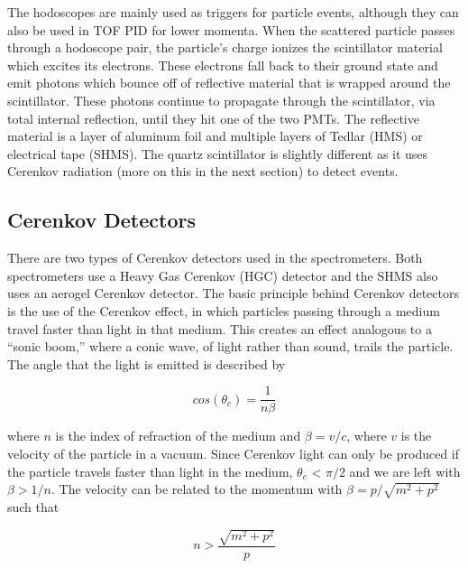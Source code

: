 \documentclass[
]{report}
\begin{document}


The hodoscopes are mainly used as triggers for particle events, although
they can also be used in TOF PID for lower momenta. When the scattered
particle passes through a hodoscope pair, the particle's charge ionizes
the scintillator material which excites its electrons. These electrons
fall back to their ground state and emit photons which bounce off of
reflective material that is wrapped around the scintillator. These
photons continue to propagate through the scintillator, via total
internal reflection, until they hit one of the two PMTs. The reflective
material is a layer of aluminum foil and multiple layers of Tedlar (HMS)
or electrical tape (SHMS). The quartz scintillator is slightly different
as it uses Cerenkov radiation (more on this in the next section) to
detect events.

\hypertarget{cerenkov-detectors}{%
\subsection{Cerenkov Detectors}\label{cerenkov-detectors}}

There are two types of Cerenkov detectors used in the spectrometers.
Both spectrometers use a Heavy Gas Cerenkov (HGC) detector and the SHMS
also uses an aerogel Cerenkov detector. The basic principle behind
Cerenkov detectors is the use of the Cerenkov effect, in which particles
passing through a medium travel faster than light in that medium. This
creates an effect analogous to a ``sonic boom,'' where a conic wave, of
light rather than sound, trails the particle. The angle that the light
is emitted is described by

\begin{equation} 
  cos(\theta_c) = \frac{1}{n\beta}
  \label{eq:theta_cer} 
\end{equation}

where \(n\) is the index of refraction of the medium and \(\beta=v/c\),
where \(v\) is the velocity of the particle in a vacuum. Since Cerenkov
light can only be produced if the particle travels faster than light in
the medium, \(\theta_c\) \textless{} \(\pi/2\) and we are left with
\(\beta > 1/n\). The velocity can be related to the momentum with
\(\beta=p/\sqrt{m^2+p^2}\) such that

\begin{equation} 
  n >\frac{\sqrt{m^2+p^2}}{p}
  \label{eq:index_cer} 
\end{equation}
\end{document}
